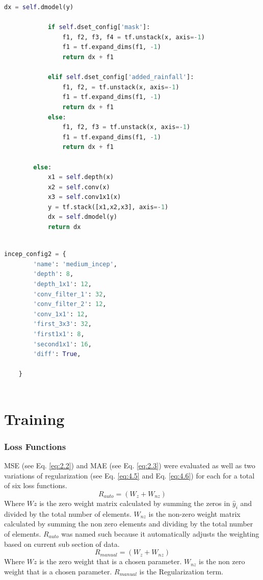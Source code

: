 \begin{lstlisting}[language=Python, label={lst:4}]
			dx = self.dmodel(y)
			
			if self.dset_config['mask']:
				f1, f2, f3, f4 = tf.unstack(x, axis=-1)
				f1 = tf.expand_dims(f1, -1)
				return dx + f1
			
			elif self.dset_config['added_rainfall']:
				f1, f2, = tf.unstack(x, axis=-1)
				f1 = tf.expand_dims(f1, -1)
				return dx + f1
			else:
				f1, f2, f3 = tf.unstack(x, axis=-1)
				f1 = tf.expand_dims(f1, -1)
				return dx + f1
		
		else:
			x1 = self.depth(x)
			x2 = self.conv(x)
			x3 = self.conv1x1(x)
			y = tf.stack([x1,x2,x3], axis=-1)
			dx = self.dmodel(y)
			return dx
	
\end{lstlisting}

\begin{lstlisting}[language=Python, label={lst:5}]
	incep_config2 = {
		'name': 'medium_incep',
		'depth': 8,
		'depth_1x1': 12,
		'conv_filter_1': 32,
		'conv_filter_2': 12,
		'conv_1x1': 12,
		'first_3x3': 32,
		'first1x1': 8,
		'second1x1': 16,
		'diff': True,
		
	}
	
\end{lstlisting}

\section{Training}
\subsubsection*{Loss Functions}
MSE (see Eq. \ref{eq:2.2}) and MAE (see Eq. \ref{eq:2.3}) were evaluated as well as two variations of regularization (see Eq. \ref{eq:4.5} and Eq. \ref{eq:4.6}) for each for a total of six loss functions.
\begin{equation}
	\label{eq:4.5}
	 R_{auto} = (W_{z} + W_{nz})
\end{equation}
Where $W{z}$ is the zero weight matrix calculated by summing the zeros in $\hat{y}_{i}$ and divided by the total number of elements. $W_{nz}$ is the non-zero weight matrix calculated by summing the non zero elements and dividing by the total number of elements. $R_{auto}$ was named such because it automatically adjusts the weighting based on current sub section of data.
\begin{equation}
	\label{eq:4.6}
	R_{manual} = (W_{z} + W_{nz})
\end{equation}
Where $W{z}$ is the zero weight that is a chosen parameter. $W_{nz}$ is the non zero weight that is a chosen parameter. $R_{manual}$ is the Regularization term.

